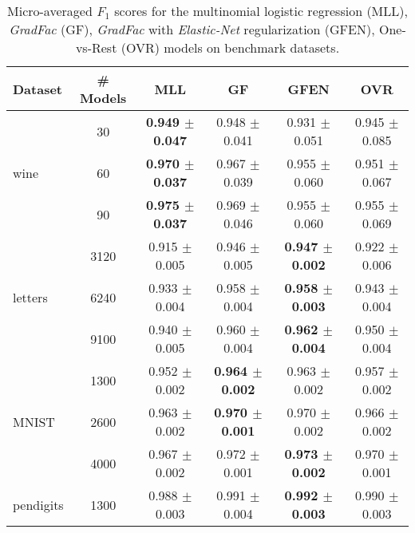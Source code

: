 \documentclass{standalone}
\begin{document}



\begin{table*}[t]
\label{exp-results}
\centering
\caption{Micro-averaged $F_{1}$ scores for the multinomial logistic regression (MLL), \emph{GradFac} (GF), \emph{GradFac} with \emph{Elastic-Net} regularization (GFEN), One-vs-Rest (OVR) models on benchmark datasets.}
\vskip 0.15in
\begin{small}
\begin{sc}
{\renewcommand{\arraystretch}{1.2}%
\begin{tabular}{|l|c|c|c|c|c|}
\hline
\abovespace\belowspace
Dataset		& \# Models 	& MLL & GF & GFEN 	& OVR  \\
\hline\hline
\multirow{3}{*}{wine}
	& 30    		& \textbf{0.949 $\pm$ 0.047} & 0.948 $\pm$ 0.041 & 0.931 $\pm$ 0.051 & 0.945 $\pm$ 0.085\\
	& 60	  		& \textbf{0.970 $\pm$ 0.037} & 0.967 $\pm$ 0.039 & 0.955 $\pm$ 0.060 & 0.951 $\pm$ 0.067\\
	& 90    		& \textbf{0.975 $\pm$ 0.037} & 0.969 $\pm$ 0.046 & 0.955 $\pm$ 0.060 & 0.955 $\pm$ 0.069\\
\hline
\multirow{3}{*}{letters}
	& 3120			& 0.915 $\pm$ 0.005 & 0.946 $\pm$ 0.005 & \textbf{0.947 $\pm$ 0.002} & 0.922 $\pm$ 0.006\\
	& 6240	 		& 0.933 $\pm$ 0.004 & 0.958 $\pm$ 0.004 & \textbf{0.958 $\pm$ 0.003} & 0.943 $\pm$ 0.004\\
	& 9100 			& 0.940 $\pm$ 0.005 & 0.960 $\pm$ 0.004 & \textbf{0.962 $\pm$ 0.004} & 0.950 $\pm$ 0.004\\
\hline
\multirow{3}{*}{MNIST}
	& 1300			& 0.952 $\pm$ 0.002 & \textbf{0.964 $\pm$ 0.002} 	& 0.963 $\pm$ 0.002 			& 0.957 $\pm$ 0.002\\
	& 2600			& 0.963 $\pm$ 0.002 & \textbf{0.970 $\pm$ 0.001} 	& 0.970 $\pm$ 0.002 			& 0.966 $\pm$ 0.002\\
	& 4000			& 0.967 $\pm$ 0.002 & 0.972 $\pm$ 0.001 			& \textbf{0.973 $\pm$ 0.002} 	& 0.970 $\pm$ 0.001\\
\hline
\multirow{3}{*}{pendigits}
	& 1300			& 0.988 $\pm$ 0.003 & 0.991 $\pm$ 0.004 & \textbf{0.992 $\pm$ 0.003} & 0.990 $\pm$ 0.003 \\

\end{tabular}}
\end{sc}
\end{small}
\end{table*}
\end{document}
